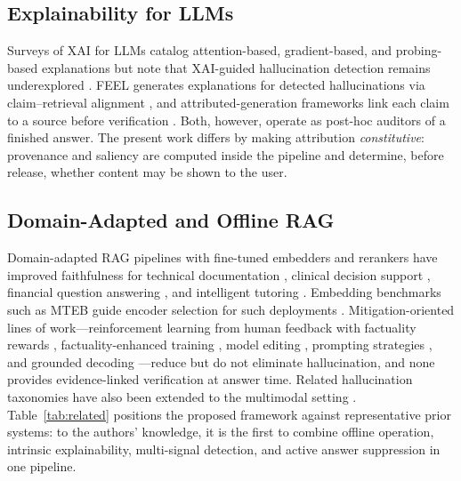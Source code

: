 \documentclass[journal]{IEEEtran}
\begin{document}
\subsection{Explainability for LLMs}
Surveys of XAI for LLMs catalog attention-based, gradient-based, and
probing-based explanations but note that XAI-guided hallucination detection
remains underexplored \cite{minaee2024xai}. FEEL generates explanations for
detected hallucinations via claim--retrieval alignment \cite{zhang2024feel},
and attributed-generation frameworks link each claim to a source before
verification \cite{agrawal2024attributed}. Both, however, operate as
post-hoc auditors of a finished answer. The present work differs by making
attribution \emph{constitutive}: provenance and saliency are computed inside
the pipeline and determine, before release, whether content may be shown to
the user.

\subsection{Domain-Adapted and Offline RAG}
Domain-adapted RAG pipelines with fine-tuned embedders and rerankers have
improved faithfulness for technical documentation
\cite{krainovskikh2026domain}, clinical decision support
\cite{ibrahim2024clinical,pal2023medical}, financial question answering
\cite{islam2023financebench}, and intelligent tutoring
\cite{zheng2025educational,chen2024tutoring}. Embedding benchmarks such as
MTEB guide encoder selection for such deployments \cite{muennighoff2022mteb}.
Mitigation-oriented lines of work---reinforcement learning from human
feedback with factuality rewards \cite{stiennon2020rlhf,li2023rlhf},
factuality-enhanced training \cite{lee2022factuality}, model editing
\cite{meng2022rome}, prompting strategies \cite{wei2022cot,dong2022prompt},
and grounded decoding \cite{huang2023grounded}---reduce but do not eliminate
hallucination, and none provides evidence-linked verification at answer
time. Related hallucination taxonomies have also been extended to the
multimodal setting \cite{shi2024multimodal}. Table~\ref{tab:related}
positions the proposed framework against representative prior systems: to
the authors' knowledge, it is the first to combine offline operation,
intrinsic explainability, multi-signal detection, and active answer
suppression in one pipeline.
\end{document}
